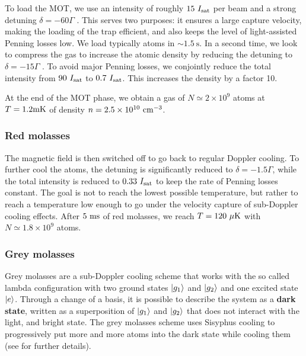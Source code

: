 To load the MOT, we use an intensity of roughly $15 \ I_{\mathrm{sat}}$ per beam and a strong detuning $\delta =-60 \Gamma$ . This serves two purposes: it ensures a large capture velocity, making the loading of the trap efficient, and also keeps the level of light-assisted Penning losses low. We load typically  atoms in $\sim 1.5 \ \mathrm{s}$. In a second time, we look to compress the gas to increase the atomic density by reducing the detuning to $\delta =-15 \Gamma$ . To avoid major Penning losses, we conjointly reduce the total intensity from $90 \ I_{\mathrm{sat}}$ to $0.7 \ I_{\mathrm{sat}}$. This increases the density by a factor 10.

At the end of the MOT phase, we obtain a gas of $N \simeq 2 \times 10^9$ atoms at $T=1.2 \rm{mK}$ of density $n=2.5 \times 10^{10} \ \rm{cm}^{-3}$.

\subsubsection{Red molasses}

The magnetic field is then switched off to go back to regular Doppler cooling. To further cool the atoms, the detuning is significantly reduced to $\delta=-1.5 \Gamma$, while the total intensity is reduced to $0.33 \ I_{\mathrm{sat}}$ to keep the rate of Penning losses constant. The goal is not to reach the lowest possible temperature, but rather to reach a temperature low enough to go under the velocity capture of sub-Doppler cooling effects. After $5 \ \rm{ms}$ of red molasses, we reach $T=120 \ \mu \rm{K}$ with $N\simeq 1.8 \times 10^9$ atoms.

\subsubsection{Grey molasses}


Grey molasses are a sub-Doppler cooling scheme that works with the so called lambda configuration with two ground states $\ket{g_1}$ and $\ket{g_2}$ and one excited state $\ket{e}$. Through a change of a basis, it is possible to describe the system as a \textbf{dark state}, written as a superposition of $\ket{g_1}$ and $\ket{g_2}$ that does not interact with the light, and bright state. The grey molasses scheme uses Sisyphus cooling to progressively put more and more atoms into the dark state while cooling them  (see \cite{cayla_these,bouton_these} for further details).



